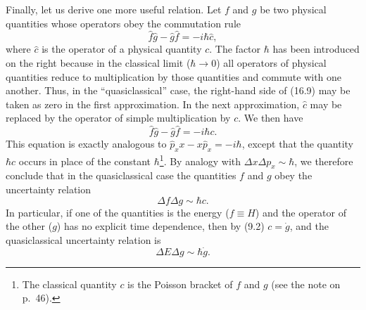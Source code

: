 Finally, let us derive one more useful relation. Let $f$ and $g$ be two
physical quantities whose operators obey the commutation rule
\begin{equation}
  \hat f\hat g-\hat g\hat f=-i\hbar\hat c,
  \tag{16.9}
\end{equation}
where $\hat c$ is the operator of a physical quantity $c$. The factor $\hbar$
has been introduced on the right because in the classical limit
($\hbar\to0$) all operators of physical quantities reduce to multiplication
by those quantities and commute with one another. Thus, in the
``quasiclassical'' case, the right-hand side of (16.9) may be taken as zero in
the first approximation. In the next approximation, $\hat c$ may be replaced
by the operator of simple multiplication by $c$. We then have
\[
  \hat f\hat g-\hat g\hat f=-i\hbar c.
\]
This equation is exactly analogous to
$\hat p_xx-x\hat p_x=-i\hbar$, except that the quantity $\hbar c$ occurs in
place of the constant $\hbar$\footnote{The classical quantity $c$ is the
Poisson bracket of $f$ and $g$ (see the note on p.~46).}. By analogy with
$\Delta x\Delta p_x\sim\hbar$, we therefore conclude that in the
quasiclassical case the quantities $f$ and $g$ obey the uncertainty relation
\begin{equation}
  \Delta f\Delta g\sim\hbar c.
  \tag{16.10}
\end{equation}
In particular, if one of the quantities is the energy ($f\equiv H$) and the
operator of the other ($g$) has no explicit time dependence, then by (9.2)
$c=\dot g$, and the quasiclassical uncertainty relation is
\begin{equation}
  \Delta E\Delta g\sim\hbar\dot g.
  \tag{16.11}
\end{equation}
